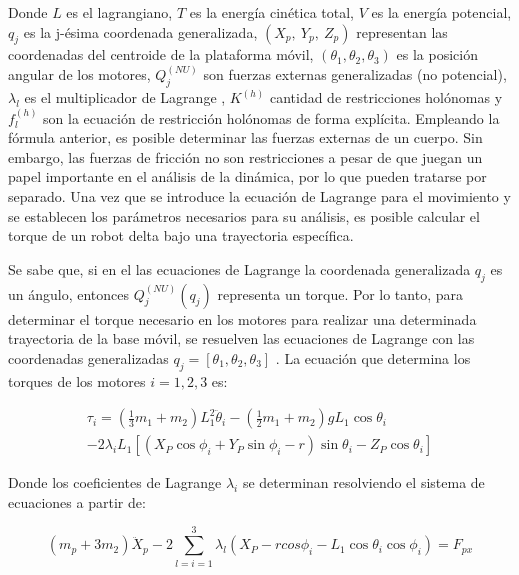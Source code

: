     
        Donde  $L$  es el lagrangiano, $T$ es la energía cinética total,  $ V$  es la energía potencial,  $ q_{j}$  es la j-ésima coordenada generalizada,  $ \left( X_{p},~Y_{p},~Z_{p} \right)$  representan las coordenadas del centroide de la plataforma móvil, $\left(  \theta _{1}, \theta _{2}, \theta _{3} \right) $  es la posición angular de los motores, $Q_{j}^{ \left( NU \right) } $  son fuerzas externas generalizadas (no potencial), $\lambda _{l}$ es el multiplicador de Lagrange , $ K^{ \left( h \right) }$ cantidad de restricciones holónomas y  $f_{l}^{ \left( h \right) }$  son la ecuación de restricción holónomas de forma explícita. Empleando la fórmula anterior, es posible determinar las fuerzas externas de un cuerpo. Sin embargo, las fuerzas de fricción no son restricciones a pesar de que juegan un papel importante en el análisis de la dinámica, por lo que pueden tratarse por separado. Una vez que se introduce la ecuación de Lagrange para el movimiento y se establecen los parámetros necesarios para su análisis, es posible calcular el torque de un robot delta bajo una trayectoria específica.
    
    
    
    
    
    \newpage
    
    
    Se sabe que, si en el las ecuaciones de Lagrange la coordenada generalizada  $  q_{j} $   es un ángulo, entonces  $  Q_{j}^{ \left( NU \right) } \left( q_{j} \right)  $   representa un torque. Por lo tanto, para determinar el torque necesario en los motores para realizar una determinada trayectoria de la base móvil, se resuelven las ecuaciones de Lagrange con las coordenadas generalizadas  $ q_{j}= \left[  \theta _{1}, \theta _{2}, \theta _{3} \right]  $  . La ecuación que determina los torques de los motores $i=1,2,3$  es:
    
    \begin{multline}
    \tau_{i}= \left( \frac{1}{3}m_{1}+m_{2} \right) L_{1}^{2}\ddot{ \theta }_{i}- \left( \frac{1}{2}m_{1}+m_{2} \right) gL_{1}\cos  \theta _{i}\\
    -2 \lambda _{i}L_{1} \left[  \left( X_{P}\cos  \phi _{i}+Y_{P}\sin  \phi _{i}- r \right) \sin  \theta _{i}-Z_{P}\cos  \theta _{i} \right] 
    \label{eq:cap4_dina_ma_15}
    \end{multline}

    Donde los coeficientes de Lagrange $  \lambda _{i} $ se determinan resolviendo el sistema de ecuaciones a partir de:
    
    \begin{equation}
     \left( m_{p}+3m_{2} \right) \ddot{X}_{p}-2 \sum _{l=i=1}^{3} \lambda _{l} \left( X_{P}- rcos \phi _{i}-L_{1}\cos  \theta _{i}\cos  \phi _{i} \right) =F_{px} 
        \label{eq:cap4_dina_ma_12}
    \end{equation}
    

